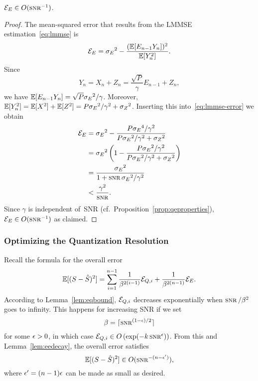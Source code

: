 \begin{lemma}
  \label{lem:eedecay}
  $\Ee \in O(\snr^{-1})$. 
\end{lemma}
\begin{proof}
  The mean-squared error that results from the LMMSE estimation~\eqref{eq:lmmse}
  is
  \begin{equation}
    \label{eq:lmmse-error}
    {{\mathcal{E}}_E} = {{\sigma_E}^2} - \frac{(\mathbb{E}[E_{n-1}
    Y_n])^2}{\mathbb{E}[Y_n^2]}. 
  \end{equation}
  Since
  \begin{equation*}
    Y_n = X_n + Z_n = \frac{\sqrt{P}}{\gamma} E_{n-1} + Z_n,
  \end{equation*}
  we have $\mathbb{E}[E_{n-1}Y_n] = \sqrt{P}{{\sigma_E}^2}/\gamma$. Moreover, $\mathbb{E}[Y_n^2] = \mathbb{E}[X^2]
  + \mathbb{E}[Z^2] = P{{\sigma_E}^2} / \gamma^2 +{{\sigma_Z}^2}$.  Inserting this
  into~\eqref{eq:lmmse-error} we obtain
  \begin{align*}
    \Ee &= \seq - \frac{P \se^4/\gamma^2}{P\seq/\gamma^2 + \szq} \\
    &= \seq \left( 1 - \frac{P\seq/\gamma^2}{P\seq/\gamma^2 + \szq} \right) \\
    &= \frac{\seq}{1 + \snr\seq/\gamma^2} \\
    & < \frac{\gamma^2}{\snr}.
  \end{align*}
  Since $\gamma$ is independent of~SNR (cf.\
  Proposition~\ref{prop:qeproperties}), $\Ee \in O(\snr^{-1})$ as claimed.
\end{proof}


\subsubsection{Optimizing the Quantization Resolution}

Recall the formula for the overall error
\begin{equation*}
  \mathbb{E}[(S-{\hat{S}})^2] = \sum_{i=1}^{n-1} \frac{1}{\beta^{2(i-1)}} {{\mathcal{E}}_{Q,i}} +
  \frac{1}{\beta^{2(n-1)}} {{\mathcal{E}}_E}.
\end{equation*}
According to Lemma~\ref{lem:eqbound}, ${{\mathcal{E}}_{Q,i}}$ decreases exponentially
when $\snr/\beta^2$ goes to infinity. This happens for increasing SNR if we
set \eg
\begin{equation*}
  \beta = \lceil \snr^{(1-\e)/2} \rceil
\end{equation*}
for some $\epsilon > 0$, in which case $\Eqi \in O\left(\exp(-k \snr^\e) \right)$.
From this and Lemma~\ref{lem:eedecay}, the overall error satisfies
\begin{equation}
  \label{eq:overallO}
  \E[(S-\Sh)^2] \in O(\snr^{-(n - \e')}),
\end{equation}
where $\epsilon' = (n-1)\epsilon$ can be made as small as desired.

